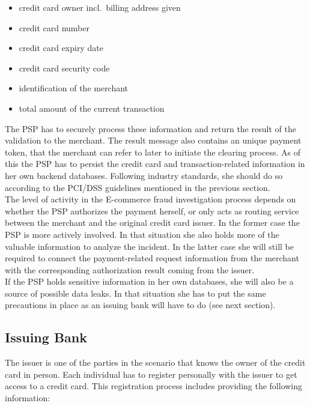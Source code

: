 \begin{itemize}
		\item credit card owner incl.\ billing address given
		\item credit card number
		\item credit card expiry date
		\item credit card security code
		\item identification of the merchant
		\item total amount of the current transaction
\end{itemize}

The \gls{PSP} has to securely process these information and return the result of the validation to the merchant. The result message also contains an unique payment token, that the merchant can refer to later to initiate the clearing process. As of this the \gls{PSP} has to persist the credit card and transaction-related information in her own backend databases. Following industry standards, she should do so according to the PCI/DSS guidelines mentioned in the previous section. \\

The level of activity in the E-commerce fraud investigation process depends on whether the \gls{PSP} authorizes the payment herself, or only acts as routing service between the merchant and the original credit card issuer. In the former case the \gls{PSP} is more actively involved. In that situation she also holds more of the valuable information to analyze the incident. In the latter case she will still be required to connect the payment-related request information from the merchant with the corresponding authorization result coming from the issuer.\\

If the \gls{PSP} holds sensitive information in her own databases, she will also be a source of possible data leaks. In that situation she has to put the same precautions in place as an issuing bank will have to do (see next section).


\subsection{Issuing Bank}
\label{subsec:stakeholder_issuer}

The issuer is one of the parties in the scenario that knows the owner of the credit card in person. Each individual has to register personally with the issuer to get access to a credit card. This registration process includes providing the following information: \@


